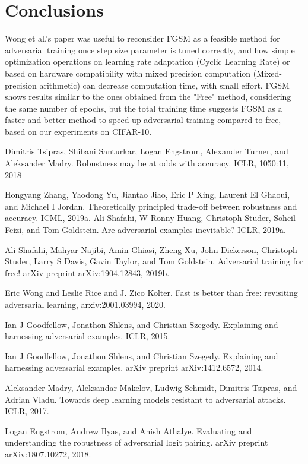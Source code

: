 \documentclass{article}
\begin{document}
\newpage
\section{Conclusions}
Wong et al.'s paper \cite{WongEtAl2020} was useful to reconsider FGSM as a feasible method for adversarial training once step size parameter is tuned correctly, and how simple optimization operations on learning rate adaptation (Cyclic Learning Rate) or based on hardware compatibility with mixed precision computation (Mixed-precision arithmetic) can decrease computation time, with small effort.
FGSM shows results similar to the ones obtained from the "Free" method, considering the same number of epochs, but the total training time suggests FGSM as a faster and better method to speed up adversarial training compared to free, based on our experiments on CIFAR-10.   



\begin{thebibliography}{100} 
	 {Dimitris Tsipras, Shibani Santurkar, Logan Engstrom, Alexander Turner, and Aleksander Madry. Robustness may be at odds with accuracy. ICLR, 1050:11, 2018}

	 {Hongyang Zhang, Yaodong Yu, Jiantao Jiao, Eric P Xing, Laurent El Ghaoui, and Michael I Jordan. Theoretically principled trade-off between robustness and accuracy. ICML, 2019a.}
	 {Ali Shafahi, W Ronny Huang, Christoph Studer, Soheil Feizi, and Tom Goldstein. Are adversarial examples inevitable? ICLR, 2019a.}
	
	 {Ali Shafahi, Mahyar Najibi, Amin Ghiasi, Zheng Xu, John Dickerson, Christoph Studer, Larry S
		Davis, Gavin Taylor, and Tom Goldstein. Adversarial training for free!
		arXiv preprint
		arXiv:1904.12843, 2019b.}
	
	 {Eric Wong and Leslie Rice and J. Zico Kolter. Fast is better than free: revisiting adversarial learning, arxiv:2001.03994, 2020.}
	
	 {Ian J Goodfellow, Jonathon Shlens, and Christian Szegedy. Explaining and harnessing adversarial examples. ICLR, 2015.}
	
	 {Ian J Goodfellow, Jonathon Shlens, and Christian Szegedy. Explaining and harnessing adversarial examples. arXiv preprint arXiv:1412.6572, 2014.}
	
	 {Aleksander Madry, Aleksandar Makelov, Ludwig Schmidt, Dimitris Tsipras, and Adrian Vladu. Towards deep learning models resistant to adversarial attacks. ICLR, 2017.}
	
	 {Logan Engstrom, Andrew Ilyas, and Anish Athalye. Evaluating and understanding the robustness of adversarial logit pairing. arXiv preprint arXiv:1807.10272, 2018.}
	
\end{thebibliography}
	
\end{document}
